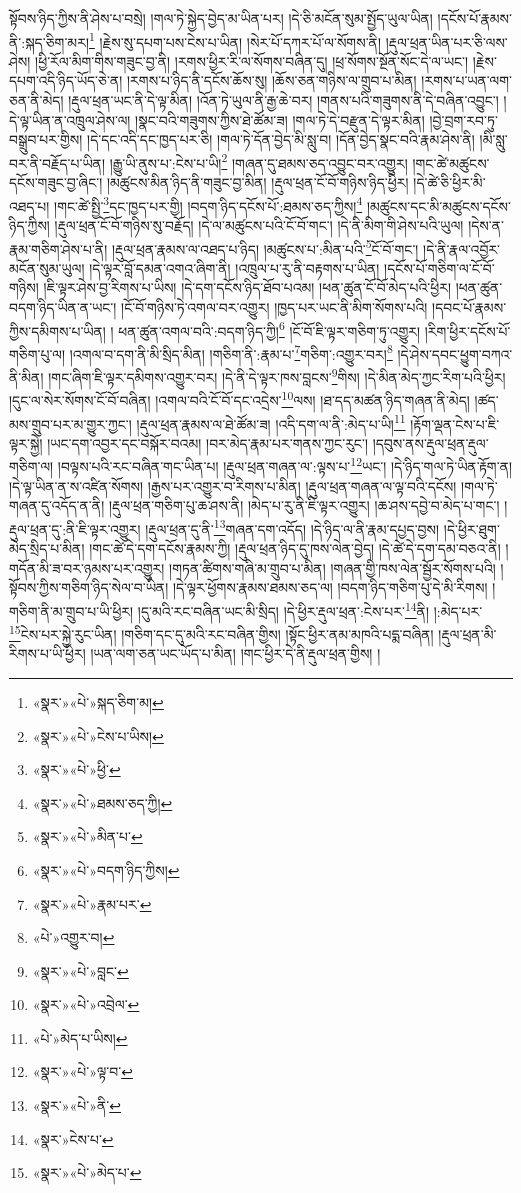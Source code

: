སྟོབས་ཉིད་ཀྱིས་ནི་ཤེས་པ་བསྲེ། །གལ་ཏེ་སྐྱེད་བྱེད་མ་ཡིན་པར། །དེ་ཅི་མངོན་སུམ་སྤྱོད་ཡུལ་ཡིན། །དངོས་པོ་རྣམས་ནི་:སྐད་ཅིག་མར།\footnote{«སྣར་»«པེ་»སྐད་ཅིག་མ།} །རྗེས་སུ་དཔག་པས་ངེས་པ་ཡིན། །སེར་པོ་དཀར་པོ་ལ་སོགས་ནི། །རྡུལ་ཕྲན་ཡིན་པར་ཅི་ལས་ཤེས། །ཕྱི་རོལ་མིག་གིས་གཟུང་བྱ་ནི། །རགས་ཕྱིར་རི་ལ་སོགས་བཞིན་དུ། །ཕྲ་སོགས་སྔོན་སོང་དེ་ལ་ཡང་། །རྗེས་དཔག་འདི་ཉིད་ཡོད་ཅེ་ན། །རགས་པ་ཉིད་ནི་དངོས་ཆོས་སུ། །ཆོས་ཅན་གཉིས་ལ་གྲུབ་པ་མིན། །རགས་པ་ཡན་ལག་ཅན་ནི་མེད། །རྡུལ་ཕྲན་ཡང་ནི་དེ་ལྟ་མིན། །འོན་ཏེ་ཡུལ་ནི་རྒྱ་ཆེ་བར། །གནས་པའི་གཟུགས་ནི་དེ་བཞིན་འབྱུང་། །དེ་ལྟ་ཡིན་ན་འཁྲུལ་ཤེས་ལ། །སྣང་བའི་གཟུགས་ཀྱིས་ཐེ་ཚོམ་ཟ། །གལ་ཏེ་དེ་བརྫུན་དེ་ལྟར་མིན། །བྱེ་བྲག་རབ་ཏུ་བསྒྲུབ་པར་གྱིས། །དེ་དང་འདི་དང་ཁྱད་པར་ཅི། །གལ་ཏེ་དོན་བྱེད་མི་སླུ་བ། །དོན་བྱེད་སྣང་བའི་རྣམ་ཤེས་ནི། །མི་སླུ་བར་ནི་བརྗོད་པ་ཡིན། །རྒྱུ་ཡི་ནུས་པ་:ངེས་པ་ཡི།\footnote{«སྣར་»«པེ་»ངེས་པ་ཡིས།} །གཞན་དུ་ཐམས་ཅད་འབྱུང་བར་འགྱུར། །གང་ཚེ་མཚུངས་དངོས་གཟུང་བྱ་ཞིང་། །མཚུངས་མིན་ཉིད་ནི་གཟུང་བྱ་མིན། །རྡུལ་ཕྲན་ངོ་བོ་གཉིས་ཉིད་ཕྱིར། །དེ་ཚེ་ཅི་ཕྱིར་མི་འཐད་པ། །གང་ཚེ་སྤྱི་\footnote{«སྣར་»«པེ་»ཕྱི་}དང་ཁྱད་པར་གྱི། །བདག་ཉིད་དངོས་པོ་:ཐམས་ཅད་ཀྱིས།\footnote{«སྣར་»«པེ་»ཐམས་ཅད་ཀྱི།} །མཚུངས་དང་མི་མཚུངས་དངོས་ཉིད་ཀྱིས། །རྡུལ་ཕྲན་ངོ་བོ་གཉིས་སུ་བརྗོད། །དེ་ལ་མཚུངས་པའི་ངོ་བོ་གང་། །དེ་ནི་མིག་གི་ཤེས་པའི་ཡུལ། །དེས་ན་རྣམ་གཅིག་ཤེས་པ་ནི། །རྡུལ་ཕྲན་རྣམས་ལ་འཐད་པ་ཉིད། །མཚུངས་པ་:མིན་པའི་\footnote{«སྣར་»«པེ་»མིན་པ་}ངོ་བོ་གང་། །དེ་ནི་རྣལ་འབྱོར་མངོན་སུམ་ཡུལ། །དེ་ལྟར་བློ་དམན་འགའ་ཞིག་ནི། །འཁྲུལ་པ་རུ་ནི་བརྟགས་པ་ཡིན། །དངོས་པོ་གཅིག་ལ་ངོ་བོ་གཉིས། །ཇི་ལྟར་ཤེས་བྱ་རིགས་པ་ཡིས། །དེ་དག་དངོས་ཉིད་ཐོབ་པའམ། །ཕན་ཚུན་ངོ་བོ་མེད་པའི་ཕྱིར། །ཕན་ཚུན་བདག་ཉིད་ཡིན་ན་ཡང་། །ངོ་བོ་གཉིས་ཏེ་འགལ་བར་འགྱུར། །ཁྱད་པར་ཡང་ནི་མིག་སོགས་པའི། །དབང་པོ་རྣམས་ཀྱིས་དམིགས་པ་ཡིན། །
ཕན་ཚུན་འགལ་བའི་:བདག་ཉིད་ཀྱི།\footnote{«སྣར་»«པེ་»བདག་ཉིད་ཀྱིས།} །ངོ་བོ་ཇི་ལྟར་གཅིག་ཏུ་འགྱུར། །རིག་ཕྱིར་དངོས་པོ་གཅིག་པུ་ལ། །འགལ་བ་དག་ནི་མི་སྲིད་མིན། །གཅིག་ནི་:རྣམ་པ་\footnote{«སྣར་»«པེ་»རྣམ་པར་}གཅིག་:འགྱུར་བར།\footnote{«པེ་»འགྱུར་བ།} །དེ་ཤེས་དབང་ཕྱུག་བཀའ་ནི་མིན། །གང་ཞིག་ཇི་ལྟར་དམིགས་འགྱུར་བར། །དེ་ནི་དེ་ལྟར་ཁས་བླངས་\footnote{«སྣར་»«པེ་»བླང་}གིས། །དེ་མིན་མེད་ཀྱང་རིག་པའི་ཕྱིར། །དུང་ལ་སེར་སོགས་ངོ་བོ་བཞིན། །འགལ་བའི་ངོ་བོ་དང་འདྲེས་\footnote{«སྣར་»«པེ་»འབྲེལ་}ལས། །ཐ་དད་མཚན་ཉིད་གཞན་ནི་མེད། །ཚད་མས་གྲུབ་པར་མ་གྱུར་ཀྱང་། །རྡུལ་ཕྲན་རྣམས་ལ་ཐེ་ཚོམ་ཟ། །འདི་དག་ལ་ནི་:མེད་པ་ཡི།\footnote{«པེ་»མེད་པ་ཡིས།} །རྟོག་ལྡན་ངེས་པ་ཇི་ལྟར་སྐྱེ། །ཡང་དག་འབྱར་དང་བསྐོར་བའམ། །བར་མེད་རྣམ་པར་གནས་ཀྱང་རུང་། །དབུས་ནས་རྡུལ་ཕྲན་རྡུལ་གཅིག་ལ། །བལྟས་པའི་རང་བཞིན་གང་ཡིན་པ། །རྡུལ་ཕྲན་གཞན་ལ་:ལྟས་པ་\footnote{«སྣར་»«པེ་»ལྟ་བ་}ཡང་། །དེ་ཉིད་གལ་ཏེ་ཡིན་རྟོག་ན། །དེ་ལྟ་ཡིན་ན་ས་འཛིན་སོགས། །རྒྱས་པར་འགྱུར་བ་རིགས་པ་མིན། །རྡུལ་ཕྲན་གཞན་ལ་ལྟ་བའི་དངོས། །གལ་ཏེ་གཞན་དུ་འདོད་ན་ནི། །རྡུལ་ཕྲན་གཅིག་པུ་ཆ་ཤས་ནི། །མེད་པ་རུ་ནི་ཇི་ལྟར་འགྱུར། །ཆ་ཤས་དབྱེ་བ་མེད་པ་གང་། །རྡུལ་ཕྲན་དུ་:ནི་ཇི་ལྟར་འགྱུར། །རྡུལ་ཕྲན་དུ་ནི་\footnote{«སྣར་»«པེ་»ནི་}གཞན་དག་འདོད། །དེ་ཉིད་ལ་ནི་རྣམ་དཔྱད་བྱས། །དེ་ཕྱིར་ཐུག་མེད་སྲིད་པ་མིན། །གང་ཚེ་དེ་དག་དངོས་རྣམས་ཀྱི། །རྡུལ་ཕྲན་ཉིད་དུ་ཁས་ལེན་བྱེད། །དེ་ཚེ་དེ་དག་དམ་བཅའ་ནི། །གདོན་མི་ཟ་བར་ཉམས་པར་འགྱུར། །གཏན་ཚིགས་གཞི་མ་གྲུབ་པ་མིན། །གཞན་གྱི་ཁས་ལེན་སྦྱོར་སོགས་པའི། །སྟོབས་ཀྱིས་གཅིག་ཉིད་སེལ་བ་ཡིན། །དེ་ལྟར་ཕྱོགས་རྣམས་ཐམས་ཅད་ལ། །བདག་ཉིད་གཅིག་པུ་དེ་མི་རིགས། །གཅིག་ནི་མ་གྲུབ་པ་ཡི་ཕྱིར། །དུ་མའི་རང་བཞིན་ཡང་མི་སྲིད། །དེ་ཕྱིར་རྡུལ་ཕྲན་:ངེས་པར་\footnote{«སྣར་»ངེས་པ་}ནི། །:མེད་པར་\footnote{«སྣར་»«པེ་»མེད་པ་}ངེས་པར་སྐྱེ་རུང་ཡིན། །གཅིག་དང་དུ་མའི་རང་བཞིན་གྱིས། །སྟོང་ཕྱིར་ནམ་མཁའི་པདྨ་བཞིན། །རྡུལ་ཕྲན་མི་རིགས་པ་ཡི་ཕྱིར། །ཡན་ལག་ཅན་ཡང་ཡོད་པ་མིན། །གང་ཕྱིར་དེ་ནི་རྡུལ་ཕྲན་གྱིས། །
